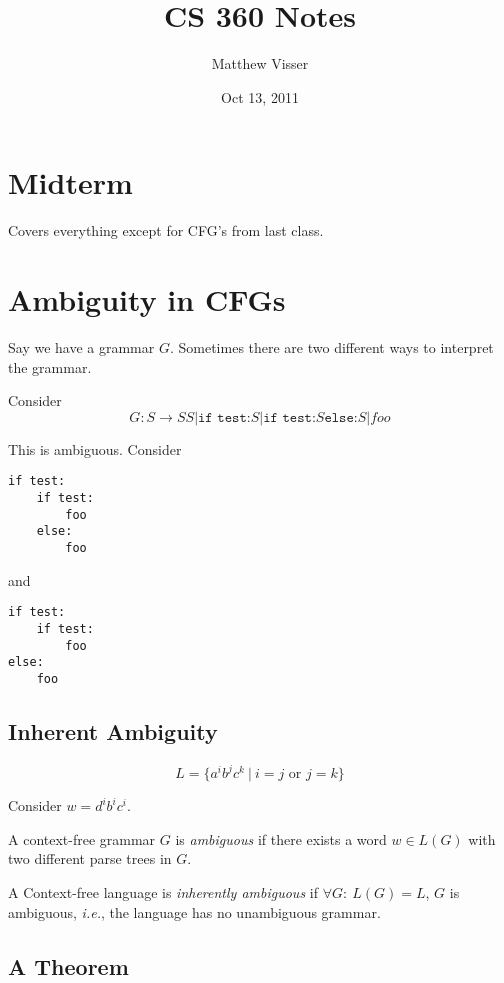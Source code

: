 \documentclass[12pt]{article}
\begin{document}
\title{CS 360 Notes}
\author{Matthew Visser}
\date{Oct 13, 2011}
\maketitle

\section{Midterm}

Covers everything except for CFG's from last class.

\section{Ambiguity in CFGs}

Say we have a grammar $G$. Sometimes there are two different ways to interpret
the grammar.

Consider
\begin{equation}
	G: S \to SS | \texttt{if test:} S | \texttt{if test:} S \texttt{else:} S | foo
	\label{grammar1}
\end{equation}

This is ambiguous. Consider
\begin{verbatim}
if test:
    if test:
        foo
    else:
        foo
\end{verbatim}
and
\begin{verbatim}
if test:
    if test:
        foo
else:
    foo
\end{verbatim}

\subsection{Inherent Ambiguity}

\begin{equation}
	L = \{a^ib^jc^k\ |\ i=j \text{ or } j=k\}
	\label{language1}
\end{equation}

Consider $w = d^ib^ic^i$.

A context-free grammar $G$ is \emph{ambiguous} if there exists a word $w \in
L(G)$ with two different parse trees in $G$.

A Context-free language is \emph{inherently ambiguous} if $\forall G:\ L(G) =
L$, $G$ is ambiguous, \textit{i.e.}, the language has no unambiguous grammar.

\subsection{A Theorem}
\end{document}

